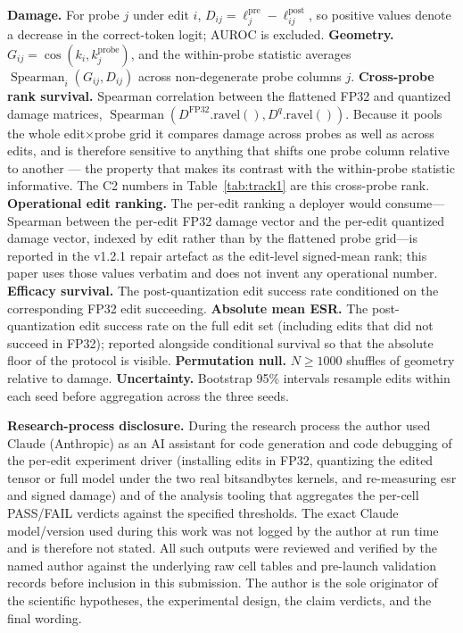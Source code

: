 \documentclass[preprint,12pt]{elsarticle}
\begin{document}
\textbf{Damage.} For probe $j$ under edit $i$,
$D_{ij}=\ell^{\mathrm{pre}}_j-\ell^{\mathrm{post}}_{ij}$, so positive values denote a
decrease in the correct-token logit; AUROC is excluded. \textbf{Geometry.}
$G_{ij}=\cos(k_i,k_j^{\mathrm{probe}})$, and the within-probe statistic averages
$\operatorname{Spearman}_i(G_{ij},D_{ij})$ across non-degenerate probe columns $j$.
\textbf{Cross-probe rank survival.} Spearman correlation between the flattened FP32 and
quantized damage matrices,
$\operatorname{Spearman}(D^{\mathrm{FP32}}.\mathrm{ravel}(),
D^{q}.\mathrm{ravel}())$. Because it pools the whole edit${\times}$probe grid it
compares damage across probes as well as across edits, and is therefore sensitive to
anything that shifts one probe column relative to another --- the property that makes
its contrast with the within-probe statistic informative. The C2 numbers in
Table~\ref{tab:track1} are this cross-probe rank. \textbf{Operational edit ranking.}
The per-edit ranking a deployer would consume---Spearman between the per-edit
FP32 damage vector and the per-edit quantized damage vector, indexed by edit
rather than by the flattened probe grid---is reported in the v1.2.1 repair
artefact as the edit-level signed-mean rank; this paper uses those values
verbatim and does not invent any operational number.
\textbf{Efficacy survival.} The post-quantization edit success rate conditioned
on the corresponding FP32 edit succeeding. \textbf{Absolute mean ESR.} The
post-quantization edit success rate on the full edit set (including edits that
did not succeed in FP32); reported alongside conditional survival so that the
absolute floor of the protocol is visible. \textbf{Permutation null.} $N \geq
1000$ shuffles of geometry relative to damage. \textbf{Uncertainty.} Bootstrap
95\% intervals resample edits within each seed before aggregation across the
three seeds.

\textbf{Research-process disclosure.} During the research process the author used
Claude (Anthropic) as an AI assistant for code generation and code debugging of the
per-edit experiment driver (installing edits in FP32, quantizing the edited tensor
or full model under the two real bitsandbytes kernels, and re-measuring esr and
signed damage) and of the analysis tooling that aggregates the per-cell PASS/FAIL
verdicts against the specified thresholds. The exact Claude model/version used
during this work was not logged by the author at run time and is therefore not
stated. All such outputs were reviewed and verified by the named author against the
underlying raw cell tables and pre-launch validation records before
inclusion in this submission. The author is the sole originator of the scientific
hypotheses, the experimental design, the claim verdicts, and the final wording.
\end{document}
